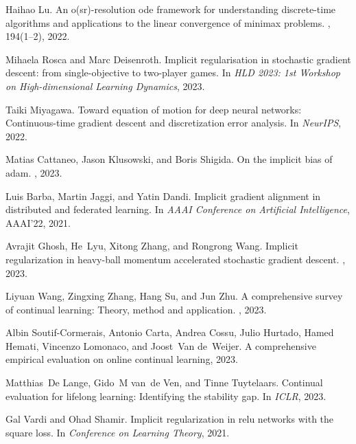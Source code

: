 \documentclass{article}
\begin{document}
\begin{thebibliography}{10}
Haihao Lu.
\newblock An o(sr)-resolution ode framework for understanding discrete-time
  algorithms and applications to the linear convergence of minimax problems.
, 194(1–2), 2022.

Mihaela Rosca and Marc Deisenroth.
\newblock Implicit regularisation in stochastic gradient descent: from
  single-objective to two-player games.
\newblock In {\em HLD 2023: 1st Workshop on High-dimensional Learning
  Dynamics}, 2023.

Taiki Miyagawa.
\newblock Toward equation of motion for deep neural networks: Continuous-time
  gradient descent and discretization error analysis.
\newblock In {\em NeurIPS}, 2022.

Matias Cattaneo, Jason Klusowski, and Boris Shigida.
\newblock On the implicit bias of adam.
, 2023.

Luis Barba, Martin Jaggi, and Yatin Dandi.
\newblock Implicit gradient alignment in distributed and federated learning.
\newblock In {\em AAAI Conference on Artificial Intelligence}, AAAI'22, 2021.

Avrajit Ghosh, He~Lyu, Xitong Zhang, and Rongrong Wang.
\newblock Implicit regularization in heavy-ball momentum accelerated stochastic
  gradient descent.
, 2023.

Liyuan Wang, Zingxing Zhang, Hang Su, and Jun Zhu.
\newblock A comprehensive survey of continual learning: Theory, method and
  application.
, 2023.

Albin Soutif-Cormerais, Antonio Carta, Andrea Cossu, Julio Hurtado, Hamed
  Hemati, Vincenzo Lomonaco, and Joost~Van de~Weijer.
\newblock A comprehensive empirical evaluation on online continual learning,
  2023.

Matthias~De Lange, Gido~M van~de Ven, and Tinne Tuytelaars.
\newblock Continual evaluation for lifelong learning: Identifying the stability
  gap.
\newblock In {\em ICLR}, 2023.

Gal Vardi and Ohad Shamir.
\newblock Implicit regularization in relu networks with the square loss.
\newblock In {\em Conference on Learning Theory}, 2021.


\end{thebibliography}
\end{document}
